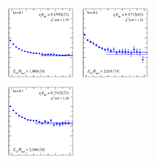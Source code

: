 \begin{figure}
  \includegraphics[width=0.28\textwidth]{figures/spectrum_a1g/no_tq/fits/fit_1.pdf}
  \includegraphics[width=0.28\textwidth]{figures/spectrum_a1g/no_tq/fits/fit_2.pdf}\\
  \includegraphics[width=0.28\textwidth]{figures/spectrum_a1g/no_tq/fits/fit_4.pdf}

\end{figure}
